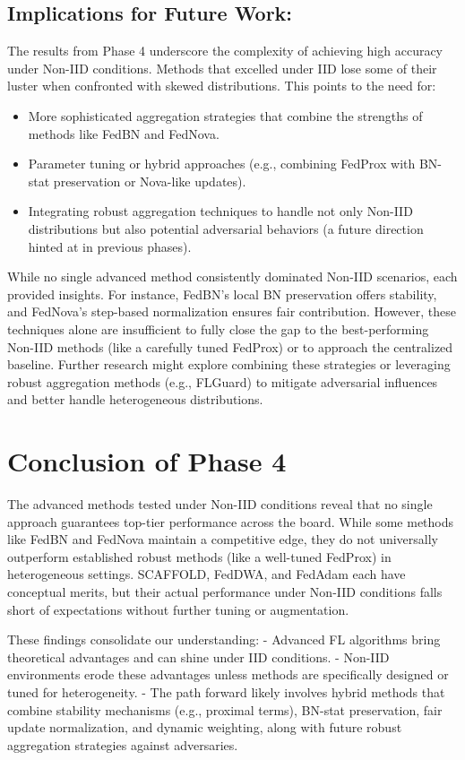 \documentclass[12pt,a4paper]{report}
\begin{document}
\subsection*{Implications for Future Work:}
The results from Phase 4 underscore the complexity of achieving high accuracy under Non-IID conditions. Methods that excelled under IID lose some of their luster when confronted with skewed distributions. This points to the need for:
\begin{itemize}
	\item More sophisticated aggregation strategies that combine the strengths of methods like FedBN and FedNova.
	\item Parameter tuning or hybrid approaches (e.g., combining FedProx with BN-stat preservation or Nova-like updates).
	\item Integrating robust aggregation techniques to handle not only Non-IID distributions but also potential adversarial behaviors (a future direction hinted at in previous phases).
\end{itemize}

While no single advanced method consistently dominated Non-IID scenarios, each provided insights. For instance, FedBN’s local BN preservation offers stability, and FedNova’s step-based normalization ensures fair contribution. However, these techniques alone are insufficient to fully close the gap to the best-performing Non-IID methods (like a carefully tuned FedProx) or to approach the centralized baseline. Further research might explore combining these strategies or leveraging robust aggregation methods (e.g., FLGuard) to mitigate adversarial influences and better handle heterogeneous distributions.

\section{Conclusion of Phase 4}

The advanced methods tested under Non-IID conditions reveal that no single approach guarantees top-tier performance across the board. While some methods like FedBN and FedNova maintain a competitive edge, they do not universally outperform established robust methods (like a well-tuned FedProx) in heterogeneous settings. SCAFFOLD, FedDWA, and FedAdam each have conceptual merits, but their actual performance under Non-IID conditions falls short of expectations without further tuning or augmentation.

These findings consolidate our understanding:
- Advanced FL algorithms bring theoretical advantages and can shine under IID conditions.
- Non-IID environments erode these advantages unless methods are specifically designed or tuned for heterogeneity.
- The path forward likely involves hybrid methods that combine stability mechanisms (e.g., proximal terms), BN-stat preservation, fair update normalization, and dynamic weighting, along with future robust aggregation strategies against adversaries.
\end{document}
